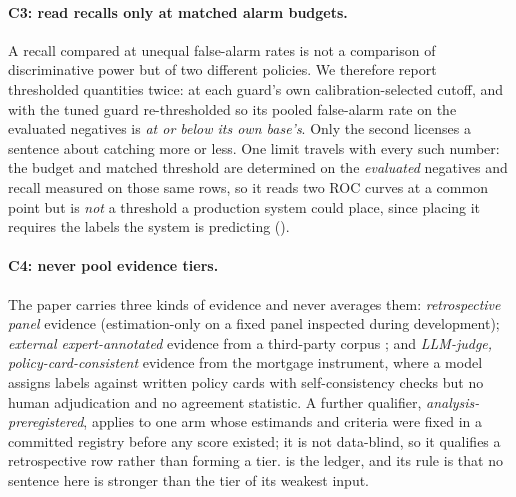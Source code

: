 \documentclass[manuscript,screen,review,anonymous]{acmart}
\begin{document}
\paragraph{C3: read recalls only at matched alarm budgets.} A recall compared at unequal false-alarm
rates is not a comparison of discriminative power but of two different policies. We therefore report
thresholded quantities twice: at each guard's own calibration-selected cutoff, and with the tuned guard
re-thresholded so its pooled false-alarm rate on the evaluated negatives is \emph{at or below its own base's}.
Only the second licenses a sentence about catching more or less. One limit travels with every such
number: the budget and matched threshold are determined on the \emph{evaluated} negatives and recall measured on
those same rows, so it reads two ROC curves at a common point but is \emph{not} a threshold a
production system could place, since placing it requires the labels the system is predicting
().

\paragraph{C4: never pool evidence tiers.} The paper carries three kinds of evidence and never averages
them: \emph{retrospective panel} evidence (estimation-only on a fixed panel inspected during
development); \emph{external expert-annotated} evidence from a third-party corpus \citep{expguard2026};
and \emph{LLM-judge, policy-card-consistent} evidence from the mortgage instrument, where a model assigns
labels against written policy cards with self-consistency checks but no human adjudication and no
agreement statistic. A further qualifier, \emph{analysis-preregistered}, applies to one arm whose
estimands and criteria were fixed in a committed registry before any score existed; it is not data-blind,
so it qualifies a retrospective row rather than forming a tier.  is the ledger, and its
rule is that no sentence here is stronger than the tier of its weakest input.
\end{document}
